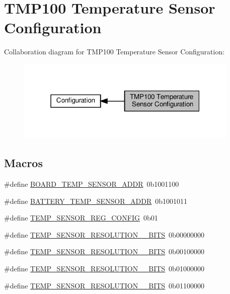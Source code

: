 \hypertarget{group__defines__tmp100__configuration}{}\section{T\+M\+P100 Temperature Sensor Configuration}
\label{group__defines__tmp100__configuration}
Collaboration diagram for T\+M\+P100 Temperature Sensor Configuration\+:
\nopagebreak
\begin{figure}[H]
\begin{center}
\leavevmode
\includegraphics[width=301pt]{group__defines__tmp100__configuration}
\end{center}
\end{figure}
\subsection*{Macros}
\begin{DoxyCompactItemize}
\item 
\#define \hyperlink{group__defines__tmp100__configuration_gaa038d9fe5bc1bccc19789a7a958065f6}{B\+O\+A\+R\+D\+\_\+\+T\+E\+M\+P\+\_\+\+S\+E\+N\+S\+O\+R\+\_\+\+A\+D\+DR}~0b1001100
\item 
\#define \hyperlink{group__defines__tmp100__configuration_gacdbd26cf9028150bbe6cb0734e4d7674}{B\+A\+T\+T\+E\+R\+Y\+\_\+\+T\+E\+M\+P\+\_\+\+S\+E\+N\+S\+O\+R\+\_\+\+A\+D\+DR}~0b1001011
\item 
\#define \hyperlink{group__defines__tmp100__configuration_ga32a821ac31cd3f35b29eeaedd2ada8a7}{T\+E\+M\+P\+\_\+\+S\+E\+N\+S\+O\+R\+\_\+\+R\+E\+G\+\_\+\+C\+O\+N\+F\+IG}~0b01
\item 
\#define \hyperlink{group__defines__tmp100__configuration_ga3d36edb45de9609b03bd822d6c918112}{T\+E\+M\+P\+\_\+\+S\+E\+N\+S\+O\+R\+\_\+\+R\+E\+S\+O\+L\+U\+T\+I\+O\+N\+\_\+\_\+\+B\+I\+TS}~0b00000000
\item 
\#define \hyperlink{group__defines__tmp100__configuration_gaf70d4e6a476885b74766b5df9a3fbc09}{T\+E\+M\+P\+\_\+\+S\+E\+N\+S\+O\+R\+\_\+\+R\+E\+S\+O\+L\+U\+T\+I\+O\+N\+\_\+\_\+\+B\+I\+TS}~0b00100000
\item 
\#define \hyperlink{group__defines__tmp100__configuration_gac97175df8d77fc1235d887430fbb1dd3}{T\+E\+M\+P\+\_\+\+S\+E\+N\+S\+O\+R\+\_\+\+R\+E\+S\+O\+L\+U\+T\+I\+O\+N\+\_\+\_\+\+B\+I\+TS}~0b01000000
\item 
\#define \hyperlink{group__defines__tmp100__configuration_ga5e14ff4c60e05aec1827aa1ecb1db92b}{T\+E\+M\+P\+\_\+\+S\+E\+N\+S\+O\+R\+\_\+\+R\+E\+S\+O\+L\+U\+T\+I\+O\+N\+\_\+\_\+\+B\+I\+TS}~0b01100000
\end{DoxyCompactItemize}


